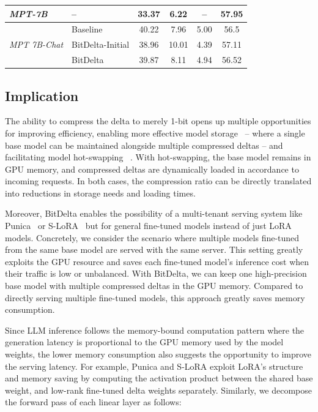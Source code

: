 \documentclass[numbers]{article}
\newcommand{\oursmethod}{BitDelta\xspace}
\begin{document}
\begin{table}[htbp]
{\begin{tabular}{@{}llcccc@{}}
        \midrule
        \textit{MPT-7B} & -- & 33.37 & 6.22 & -- & 57.95 \\
        
        \midrule
        \multirow{3}{*}{\textit{MPT 7B-Chat}} & Baseline & 40.22 & 7.96 & 5.00 & 56.5 \\
        & BitDelta-Initial & 38.96 & 10.01 & 4.39 & 57.11 \\
        & BitDelta & 39.87 & 8.11 &  4.94 & 56.52 \\
        \bottomrule

    \end{tabular}
    }
\end{table}  



\subsection{Implication}
\label{sec:performance}
The ability to compress the delta to merely 1-bit opens up multiple opportunities for improving efficiency, enabling more effective model storage~\citep{isik2023gptzip} -- where a single base model can be maintained alongside multiple compressed deltas -- and facilitating model hot-swapping ~\citep{punica,sheng2023slora}. With hot-swapping, the base model remains in GPU memory, and compressed deltas are dynamically loaded in accordance to incoming requests. In both cases, the compression ratio can be directly translated into reductions in storage needs and loading times. 

Moreover, \oursmethod enables the possibility of a multi-tenant serving system like Punica~\citep{punica} or S-LoRA~\citep{sheng2023slora} but for general fine-tuned models instead of just LoRA models. Concretely, we consider the scenario where multiple models fine-tuned from the same base model are served with the same server. This setting greatly exploits the GPU resource and saves each fine-tuned model's inference cost when their traffic is low or unbalanced. With \oursmethod, we can keep one high-precision base model with multiple compressed deltas in the GPU memory. Compared to directly serving multiple fine-tuned models, this approach greatly saves memory consumption. 


Since LLM inference follows the memory-bound computation pattern where the generation latency is proportional to the GPU memory used by the model weights, the lower memory consumption also suggests the opportunity to improve the serving latency. For example, Punica and S-LoRA exploit LoRA's structure and memory saving by computing the activation product between the shared base weight, and low-rank fine-tuned delta weights separately. Similarly, we decompose the forward pass of each linear layer as follows:
\end{document}

